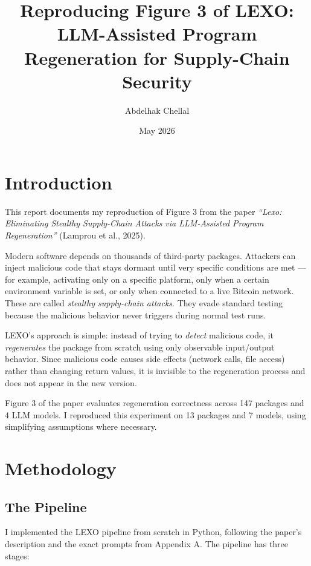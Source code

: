 \documentclass[11pt,a4paper]{article}
\title{\textbf{Reproducing Figure 3 of LEXO:\\
LLM-Assisted Program Regeneration for Supply-Chain Security}}
\author{Abdelhak Chellal}
\date{May 2026}
\begin{document}
\maketitle

\section{Introduction}

This report documents my reproduction of Figure 3 from the paper
\textit{``Lexo: Eliminating Stealthy Supply-Chain Attacks via LLM-Assisted
Program Regeneration''} (Lamprou et al., 2025).

Modern software depends on thousands of third-party packages. Attackers can
inject malicious code that stays dormant until very specific conditions are
met — for example, activating only on a specific platform, only when a
certain environment variable is set, or only when connected to a live Bitcoin
network. These are called \textit{stealthy supply-chain attacks}. They evade
standard testing because the malicious behavior never triggers during normal
test runs.

LEXO's approach is simple: instead of trying to \textit{detect} malicious
code, it \textit{regenerates} the package from scratch using only observable
input/output behavior. Since malicious code causes side effects (network
calls, file access) rather than changing return values, it is invisible to the
regeneration process and does not appear in the new version.

Figure 3 of the paper evaluates regeneration correctness across 147 packages
and 4 LLM models. I reproduced this experiment on 13 packages and 7 models,
using simplifying assumptions where necessary.

\section{Methodology}

\subsection{The Pipeline}

I implemented the LEXO pipeline from scratch in Python, following the paper's
description and the exact prompts from Appendix A. The pipeline has three stages:
\end{document}
